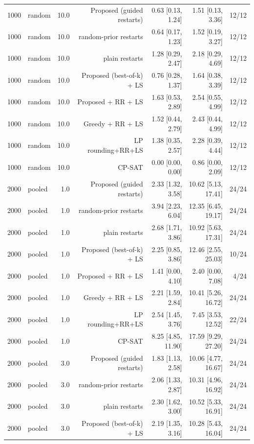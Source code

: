 \begin{table}[t]
\begin{tabular}{llrrrrr}
1000 & random & 10.0 & Proposed (guided restarts) & 0.63 [0.13, 1.24] & 1.51 [0.13, 3.36] & 12/12 \\
1000 & random & 10.0 & random-prior restarts & 0.64 [0.17, 1.23] & 1.52 [0.19, 3.27] & 12/12 \\
1000 & random & 10.0 & plain restarts & 1.28 [0.29, 2.47] & 2.18 [0.29, 4.69] & 12/12 \\
1000 & random & 10.0 & Proposed (best-of-k) + LS & 0.76 [0.28, 1.37] & 1.64 [0.38, 3.39] & 12/12 \\
1000 & random & 10.0 & Proposed + RR + LS & 1.63 [0.53, 2.89] & 2.54 [0.55, 4.99] & 12/12 \\
1000 & random & 10.0 & Greedy + RR + LS & 1.52 [0.44, 2.79] & 2.43 [0.44, 4.99] & 12/12 \\
1000 & random & 10.0 & LP rounding+RR+LS & 1.38 [0.35, 2.57] & 2.28 [0.39, 4.44] & 12/12 \\
1000 & random & 10.0 & CP-SAT & 0.00 [0.00, 0.00] & 0.86 [0.00, 2.09] & 12/12 \\
2000 & pooled & 1.0 & Proposed (guided restarts) & 2.33 [1.32, 3.58] & 10.62 [5.13, 17.41] & 24/24 \\
2000 & pooled & 1.0 & random-prior restarts & 3.94 [2.23, 6.04] & 12.35 [6.45, 19.17] & 24/24 \\
2000 & pooled & 1.0 & plain restarts & 2.68 [1.71, 3.86] & 10.92 [5.63, 17.31] & 24/24 \\
2000 & pooled & 1.0 & Proposed (best-of-k) + LS & 2.25 [0.85, 3.86] & 12.46 [2.55, 25.03] & 10/24 \\
2000 & pooled & 1.0 & Proposed + RR + LS & 1.41 [0.00, 4.10] & 2.40 [0.00, 7.08] & 4/24 \\
2000 & pooled & 1.0 & Greedy + RR + LS & 2.21 [1.59, 2.84] & 10.41 [5.26, 16.72] & 24/24 \\
2000 & pooled & 1.0 & LP rounding+RR+LS & 2.54 [1.45, 3.76] & 7.45 [3.53, 12.52] & 22/24 \\
2000 & pooled & 1.0 & CP-SAT & 8.25 [4.85, 11.90] & 17.59 [9.29, 27.20] & 24/24 \\
2000 & pooled & 3.0 & Proposed (guided restarts) & 1.83 [1.13, 2.58] & 10.06 [4.77, 16.67] & 24/24 \\
2000 & pooled & 3.0 & random-prior restarts & 2.06 [1.33, 2.87] & 10.31 [4.96, 16.92] & 24/24 \\
2000 & pooled & 3.0 & plain restarts & 2.30 [1.62, 3.00] & 10.52 [5.33, 16.91] & 24/24 \\
2000 & pooled & 3.0 & Proposed (best-of-k) + LS & 2.19 [1.35, 3.16] & 10.28 [5.43, 16.04] & 24/24 \\

\end{tabular}
\end{table}
